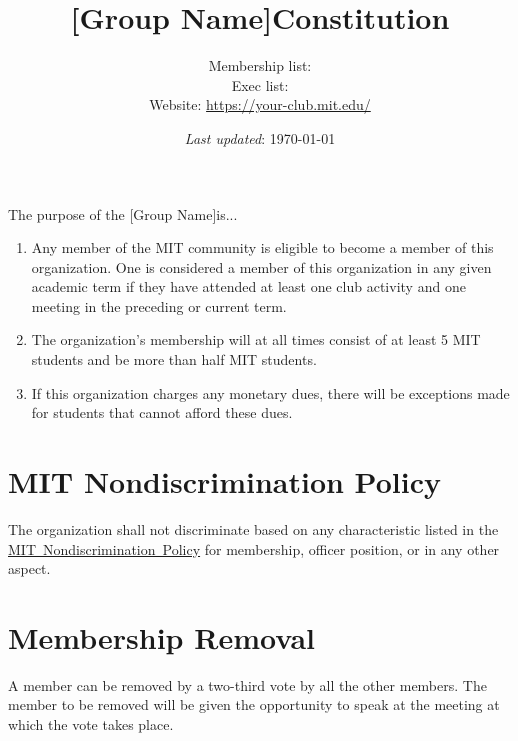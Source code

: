 \documentclass{constitution}
\def\groupname{[Group Name]}
\begin{document}
\title{\groupname Constitution}
\author{%
    Membership list:  \\
    Exec list:  \\
    Website: \url{https://your-club.mit.edu/}
}
\date{\textit{Last updated}: \today}

\maketitle

\tableofcontents




The purpose of the \groupname is...

\begin{enumerate}
    \item Any member of the MIT community is eligible to become a member of this organization.
    One is considered a member of this organization in any given academic term if they have attended at least one club activity and one meeting in the preceding or current term.

    \item The organization's membership will at all times consist of at least 5 MIT students and be more than half MIT students.

    \item If this organization charges any monetary dues, there will be exceptions made for students that cannot afford these dues.
\end{enumerate}

\section{MIT Nondiscrimination Policy}
The organization shall not discriminate based on any characteristic listed in the \href{https://handbook.mit.edu/nondiscrimination}{MIT~Nondiscrimination~Policy} for membership, officer position, or in any other aspect.

\section{Membership Removal}
A member can be removed by a two-third vote by all the other members.
The member to be removed will be given the opportunity to speak at the meeting at which the vote takes place.
\end{document}
